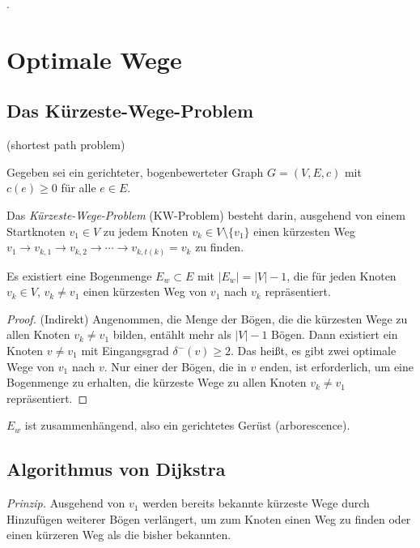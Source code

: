 \begin{exmp}
  .
\end{exmp}

\section{Optimale Wege}
\subsection{Das Kürzeste-Wege-Problem}
(shortest path problem)

Gegeben sei ein gerichteter, bogenbewerteter Graph $G = (V,E,c)$ mit $c(e) \ge
0$ für alle $e \in E$.

\begin{defn}
  Das \emph{Kürzeste-Wege-Problem} (KW-Problem) besteht darin, ausgehend von
  einem Startknoten $v_1 \in V$ zu jedem Knoten $v_k \in V \setminus \{ v_1 \}$
  einen kürzesten Weg $v_1 \to v_{k,1} \to v_{k,2} \to \cdots \to  v_{k,t(k)} =
  v_k$ zu finden.
\end{defn}

\begin{aus}
  Es existiert eine Bogenmenge $E_w \subset E$ mit $|E_w| = |V| -1$, die für
  jeden Knoten $v_k \in V$, $v_k \ne v_1$ einen kürzesten Weg von $v_1$ nach
  $v_k$ repräsentiert.
\end{aus}

\begin{proof}
  (Indirekt) Angenommen, die Menge der Bögen, die die kürzesten Wege zu allen
  Knoten $v_k \ne v_1$ bilden, entählt mehr als $|V| - 1$ Bögen. Dann existiert
  ein Knoten $v \ne v_1$ mit Eingangsgrad $\delta^-(v) \ge 2$. Das heißt, es
  gibt zwei optimale Wege von $v_1$ nach $v$. Nur einer der Bögen, die in $v$
  enden, ist erforderlich, um eine Bogenmenge zu erhalten, die kürzeste Wege zu
  allen Knoten $v_k \ne v_1$ repräsentiert.
\end{proof}

\begin{flg}
  $E_w$ ist zusammenhängend, also ein gerichtetes Gerüst (arborescence).
\end{flg}

\subsection*{Algorithmus von Dijkstra}
\emph{Prinzip.} Ausgehend von $v_1$ werden bereits bekannte kürzeste Wege durch
Hinzufügen weiterer Bögen verlängert, um zum Knoten einen Weg zu finden oder
einen kürzeren Weg als die bisher bekannten.
 
